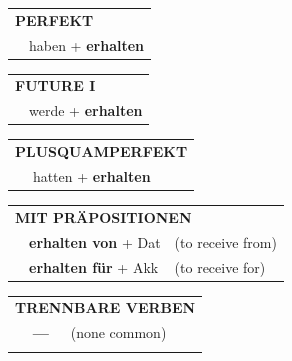 \documentclass[10pt,a4paper]{revtex4-2}
\begin{document}
\begin{verbbox}
 \begin{tabular}{rl}
     \multicolumn{2}{l}{\textbf{PERFEKT}}\\
   & haben + \textbf{erhalten}\\
  \end{tabular}
\hfill
   \begin{tabular}{rl}
    \multicolumn{2}{l}{\textbf{FUTURE I} }\\
   & werde + \textbf{erhalten}\\
  \end{tabular}
\hfill
   \begin{tabular}{rl}
      \multicolumn{2}{l}{\textbf{PLUSQUAMPERFEKT}}\\
   & hatten + \textbf{erhalten}\\
  \end{tabular}

   \vspace{10pt}

   \begin{tabular}{lll}
      \multicolumn{3}{l}{\textbf{MIT PRÄPOSITIONEN}}\\
& \textbf{erhalten von} + Dat & (to receive from)\\
& \textbf{erhalten für} + Akk & (to receive for)\\
\end{tabular}
  \hfill
   \begin{tabular}{lll}
      \multicolumn{3}{l}{\textbf{TRENNBARE VERBEN}}\\
 & \textbf{---} & (none common)\\
\vspace{10pt}
  \end{tabular}

  \vspace{-5pt}

\end{verbbox}
\end{document}

